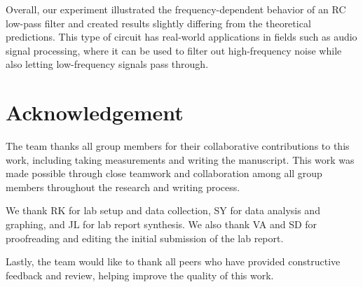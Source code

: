\documentclass[10pt,journal,twoside]{IEEEtran} %
\begin{document}
Overall, our experiment illustrated the frequency-dependent behavior of an RC low-pass filter and created results slightly differing from the theoretical predictions. This type of circuit has real-world applications in fields such as audio signal processing, where it can be used to filter out high-frequency noise while also letting low-frequency signals pass through. 

\section*{Acknowledgement} %

The team thanks all group members for their collaborative contributions to this work, including taking measurements and writing the manuscript. This work was made possible through close teamwork and collaboration among all group members throughout the research and writing process. 

We thank RK for lab setup and data collection, SY for data analysis and graphing, and JL for lab report synthesis. We also thank VA and SD for proofreading and editing the initial submission of the lab report.

Lastly, the team would like to thank all peers who have provided constructive feedback and review, helping improve the quality of this work. 




\newpage

\vfill
\end{document}
